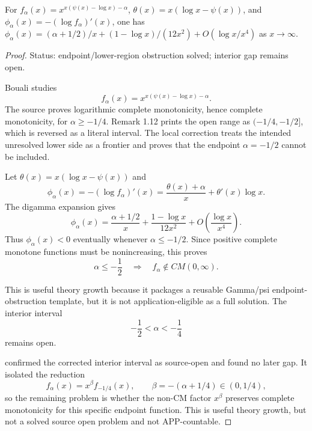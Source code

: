 \begin{lemma}
\label{res:bouali-falpha-phi-asymptotic}
For \(f_\alpha(x)=x^{x(\psi(x)-\log x)-\alpha}\), \(\theta(x)=x(\log x-\psi(x))\), and \(\phi_\alpha(x)=-(\log f_\alpha)'(x)\), one has \(\phi_\alpha(x)=(\alpha+1/2)/x+(1-\log x)/(12x^2)+O(\log x/x^4)\) as \(x\to\infty\).
\end{lemma}
\begin{proof}
Status: endpoint/lower-region obstruction solved; interior gap remains open.

Bouali studies
\[
f_\alpha(x)=x^{x(\psi(x)-\log x)-\alpha}.
\]
The source proves logarithmic complete monotonicity, hence complete monotonicity, for \(\alpha\ge -1/4\). Remark 1.12 prints the open range as \((-1/4,-1/2]\), which is reversed as a literal interval. The local correction treats the intended unresolved lower side as a frontier and proves that the endpoint \(\alpha=-1/2\) cannot be included.

Let \(\theta(x)=x(\log x-\psi(x))\) and
\[
\phi_\alpha(x)=-(\log f_\alpha)'(x)=\frac{\theta(x)+\alpha}{x}+\theta'(x)\log x.
\]
The digamma expansion gives
\[
\phi_\alpha(x)=\frac{\alpha+1/2}{x}+\frac{1-\log x}{12x^2}+O\!\left(\frac{\log x}{x^4}\right).
\]
Thus \(\phi_\alpha(x)<0\) eventually whenever \(\alpha\le -1/2\). Since positive complete monotone functions must be nonincreasing, this proves
\[
\alpha\le -\frac12 \quad\Longrightarrow\quad f_\alpha\notin CM(0,\infty).
\]

This is useful theory growth because it packages a reusable Gamma/psi endpoint-obstruction template, but it is not application-eligible as a full solution. The interior interval
\[
-\frac12<\alpha<-\frac14
\]
remains open.

confirmed the corrected interior interval as source-open and found no later
gap. It isolated the reduction
\[
f_\alpha(x)=x^\beta f_{-1/4}(x),
\qquad
\beta=-(\alpha+1/4)\in(0,1/4),
\]
so the remaining problem is whether the non-CM factor \(x^\beta\) preserves
complete monotonicity for this specific endpoint function. This is useful
theory growth, but not a solved source open problem and not APP-countable.
\end{proof}

